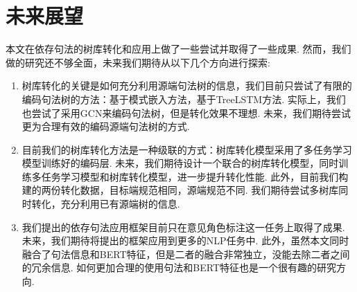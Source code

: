 \section{未来展望}

本文在依存句法的树库转化和应用上做了一些尝试并取得了一些成果. 然而，我们做的研究还不够全面，未来我们期待从以下几个方向进行探索:
\begin{enumerate}
      \item 树库转化的关键是如何充分利用源端句法树的信息，我们目前只尝试了有限的编码句法树的方法：基于模式嵌入方法，基于TreeLSTM方法.
            实际上，我们也尝试了采用GCN来编码句法树，但是转化效果不理想.
            未来，我们期待尝试更为合理有效的编码源端句法树的方式.
      \item 目前我们的树库转化方法是一种级联的方式：树库转化模型采用了多任务学习模型训练好的编码层.
            未来，我们期待设计一个联合的树库转化模型，同时训练多任务学习模型和树库转化模型，进一步提升转化性能.
            此外，目前我们构建的两份转化数据，目标端规范相同，源端规范不同.
            我们期待尝试多树库同时转化，充分利用已有源端树的信息.
      \item 我们提出的依存句法应用框架目前只在意见角色标注这一任务上取得了成果.
            未来，我们期待将提出的框架应用到更多的NLP任务中.
            此外，虽然本文同时融合了句法信息和BERT特征，但是二者的融合非常独立，没能去除二者之间的冗余信息.
            如何更加合理的使用句法和BERT特征也是一个很有趣的研究方向.
\end{enumerate}
